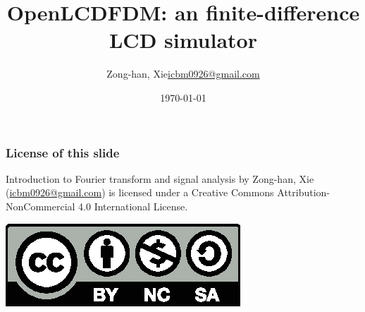 \documentclass{beamer}
\title{OpenLCDFDM: an finite-difference LCD simulator}
\author{\texorpdfstring{Zong-han, Xie\newline\url{icbm0926@gmail.com}}{Zong-han, Xie}}
\date{\today}
\begin{document}
\begin{frame}
\titlepage
\end{frame}
\begin{frame}[label=licensepage]
\frametitle{License of this slide}
Introduction to Fourier transform and signal analysis by Zong-han, Xie (\href{icbm0926@gmail.com}{icbm0926@gmail.com}) is licensed under a Creative Commons Attribution-NonCommercial 4.0 International License. \newline
\begin{center}
\includegraphics[scale=2]{by-nc-sa.eps}
\end{center}
\end{frame}
\end{document}
